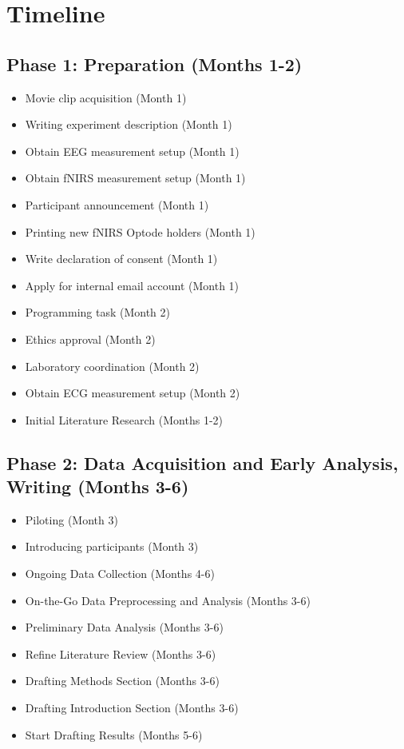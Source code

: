 \documentclass[12pt]{article} %
\begin{document}
\newpage
\section{Timeline}
\subsection{Phase 1: Preparation (Months 1-2)}
\begin{itemize}
    \item Movie clip acquisition (Month 1)
    \item Writing experiment description (Month 1)
    \item Obtain EEG measurement setup (Month 1)
    \item Obtain fNIRS measurement setup (Month 1)
    \item Participant announcement (Month 1)
    \item Printing new fNIRS Optode holders (Month 1)
    \item Write declaration of consent (Month 1)
    \item Apply for internal email account (Month 1)
    \item Programming task (Month 2)
    \item Ethics approval (Month 2)
    \item Laboratory coordination (Month 2)
    \item Obtain ECG measurement setup (Month 2)
    \item Initial Literature Research (Months 1-2)
\end{itemize}

\subsection{Phase 2: Data Acquisition and Early Analysis, Writing (Months 3-6)}
\begin{itemize}
    \item Piloting (Month 3)
    \item Introducing participants (Month 3)
    \item Ongoing Data Collection (Months 4-6)
    \item On-the-Go Data Preprocessing and Analysis (Months 3-6)
    \item Preliminary Data Analysis (Months 3-6)
    \item Refine Literature Review (Months 3-6)
    \item Drafting Methods Section (Months 3-6)
    \item Drafting Introduction Section (Months 3-6)
    \item Start Drafting Results (Months 5-6)
\end{itemize}
\end{document}
